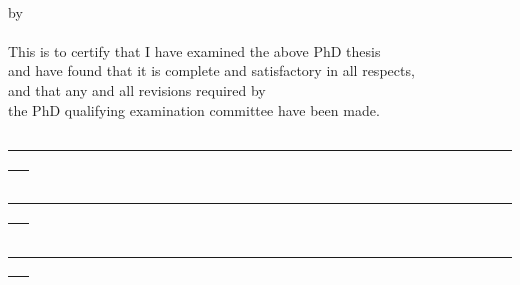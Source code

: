 \begin{center}
{\Large \thesistitle}\\
\vspace{5mm}
by\\
\vspace{3mm}
\thesisauthor\\
\vspace{5mm}
This is to certify that I have examined the above PhD thesis\\
and have found that it is complete and satisfactory in all respects,\\
and that any and all revisions required by\\
the PhD qualifying examination committee have been made.
\end{center}

\vspace{15mm}

\begin{center}
\underline{~~~~~~~~~~~~~~~~~~~~~~~~~~~~~~~~~~~~~~~~~~~~~~~~~~~~~~~~~~~~~~~~~~~~~~~~~~~ }\\
\supervisorinfo
\end{center}

\vspace{15mm}
\begin{center}
\underline{~~~~~~~~~~~~~~~~~~~~~~~~~~~~~~~~~~~~~~~~~~~~~~~~~~~~~~~~~~~~~~~~~~~~~~~~~~~ }\\
\cosupervisorinfo
\end{center}

\vspace{15mm}
\begin{center}
\underline{~~~~~~~~~~~~~~~~~~~~~~~~~~~~~~~~~~~~~~~~~~~~~~~~~~~~~~~~~~~~~~~~~~~~~~~~~~~ }\\
\depheadinfo
\end{center}

\vspace{5mm}
\begin{center}
\departmentname\\
\vspace{5mm}
\signdate
\end{center}
